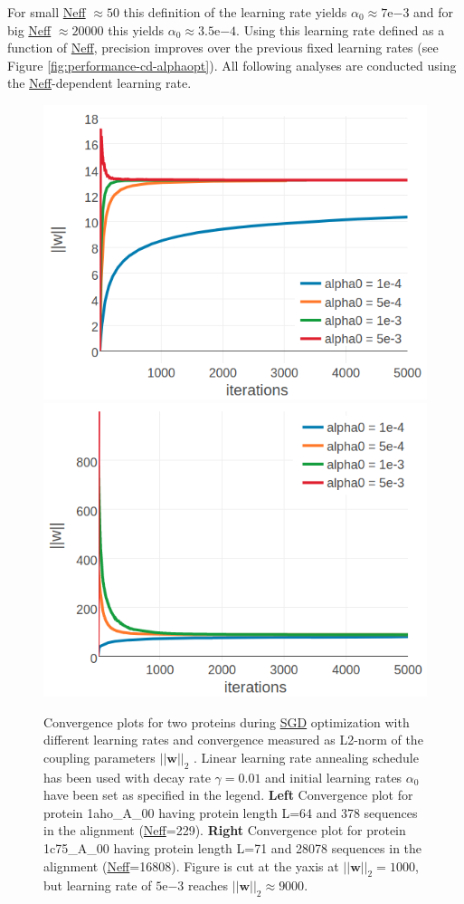 \documentclass[11pt,a4paper,twoside]{book}
\newcommand{\w}{\mathbf{w}}
\theoremstyle{definition}
\theoremstyle{definition}
\theoremstyle{remark}
\begin{document}
For small \protect\hyperlink{abbrev}{Neff} \(\approx 50\) this
definition of the learning rate yields
\(\alpha_0 \approx 7\mathrm{e}{-3}\) and for big
\protect\hyperlink{abbrev}{Neff} \(\approx 20000\) this yields
\(\alpha_0 \approx 3.5\mathrm{e}{-4}\). Using this learning rate defined
as a function of \protect\hyperlink{bbrev}{Neff}, precision improves
over the previous fixed learning rates (see Figure
\ref{fig:performance-cd-alphaopt}). All following analyses are conducted
using the \protect\hyperlink{abbrev}{Neff}-dependent learning rate.















\begin{figure}

{\centering \includegraphics[width=0.48\linewidth]{img/full_likelihood/sgd/parameter_norm_1ahoa00_alphas_lindecay001} \includegraphics[width=0.48\linewidth]{img/full_likelihood/sgd/parameter_norm_1c75a00_alphas_lindecay001} 

}

\caption{Convergence
plots for two proteins during \protect\hyperlink{abbrev}{SGD}
optimization with different learning rates and convergence measured as
L2-norm of the coupling parameters \(||\w||_2\) . Linear learning rate
annealing schedule has been used with decay rate \(\gamma=0.01\) and
initial learning rates \(\alpha_0\) have been set as specified in the
legend. \textbf{Left} Convergence plot for protein 1aho\_A\_00 having
protein length L=64 and 378 sequences in the alignment
(\protect\hyperlink{abbrev}{Neff}=229). \textbf{Right} Convergence plot
for protein 1c75\_A\_00 having protein length L=71 and 28078 sequences
in the alignment (\protect\hyperlink{abbrev}{Neff}=16808). Figure is cut
at the yaxis at \(||\w||_2=1000\), but learning rate of
\(5\mathrm{e}{-3}\) reaches \(||\w||_2 \approx 9000\).}\label{fig:sgd-single-proteins-initial-learning-rate}
\end{figure}
\end{document}
